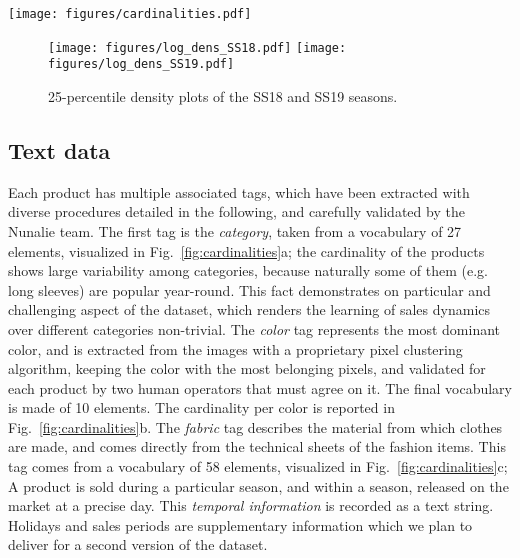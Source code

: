 \documentclass{article}
\begin{document}
\begin{figure*}[t]
        \texttt{[image: figures/cardinalities.pdf]}
        \caption{Cardinalities of the dataset per categories (a), color (b) and fabric (c)}
        \label{fig:cardinalities}
\end{figure*}

\begin{figure}[t]
    \centering
    \texttt{[image: figures/log\_dens\_SS18.pdf]}\hfill
    \texttt{[image: figures/log\_dens\_SS19.pdf]}
     \caption{25-percentile density plots of the SS18 and SS19 seasons.}
    \label{fig:sales}
\end{figure}
\iffalse
\begin{figure}[t]
        \texttt{[image: figures/ss18\_19]}\hfill
        \texttt{[image: figures/long\_sl]}\hfill
        \texttt{[image: figures/kimono\_dr]}\hfill
     \caption{Histograms of the first 4 weeks of sales for seasons SS18 (above) and SS19(below): a) all the categories are shown; b) the most populated category: long sleeves; c) on of the least populated category: kimono skirt.}
    \label{fig:histo}
\end{figure}
\fi

\subsection{Text data} Each product has multiple associated tags, which have been extracted with diverse procedures detailed in the following, and carefully validated by the Nunalie team. The first tag is the \emph{category}, taken from a vocabulary of 27 elements, visualized in Fig.~\ref{fig:cardinalities}a; the cardinality of the products shows large variability among categories, because naturally some of them (e.g. long sleeves) are popular year-round. This fact demonstrates on particular and challenging aspect of the dataset, which renders the learning of sales dynamics over different categories non-trivial. The \emph{color} tag represents the most dominant color, and is extracted from the images with a proprietary pixel clustering algorithm, keeping the color with the most belonging pixels, and validated for each product by two human operators that must agree on it. The final vocabulary is made of 10 elements. The cardinality per color is reported in Fig.~\ref{fig:cardinalities}b. The \emph{fabric} tag describes the material from which clothes are made, and comes directly from the technical sheets of the fashion items. This tag comes from a vocabulary of 58 elements, visualized in Fig.~\ref{fig:cardinalities}c; A product is sold during a particular season, and within a season, released on the market at a precise day. This \emph{temporal information} is recorded as a text string. Holidays and sales periods are supplementary information which we plan to deliver for a second version of the dataset. 
\end{document}
